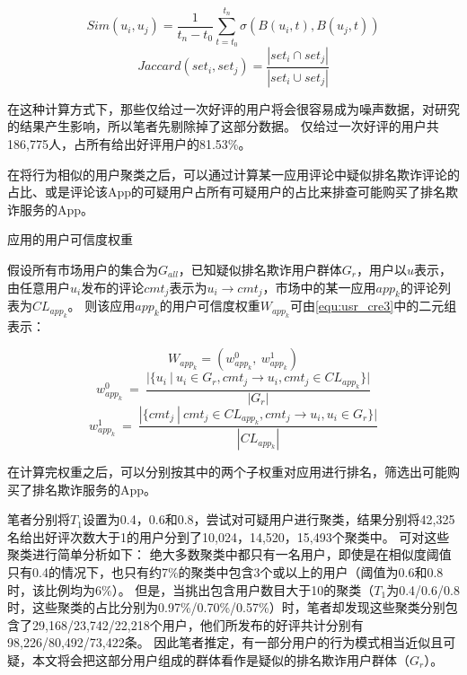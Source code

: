 \begin{equation}
Sim(u_i, u_j) = \frac{1}{t_n - t_0}\sum_{t=t_0}^{t_n}\sigma(B(u_i, t), B(u_j, t))
\label{equ:usr_cre1}
\end{equation}
\begin{equation}
Jaccard(set_i, set_j) = \frac{|set_i \cap set_j|}{|set_i \cup set_j|}
\label{equ:usr_cre2}
\end{equation}
\vspace{0.5mm}

在这种计算方式下，那些仅给过一次好评的用户将会很容易成为噪声数据，对研究的结果产生影响，所以笔者先剔除掉了这部分数据。
仅给过一次好评的用户共186,775人，占所有给出好评用户的81.53\%。

在将行为相似的用户聚类之后，可以通过计算某一应用评论中疑似排名欺诈评论的占比、或是评论该App的可疑用户占所有可疑用户的占比来排查可能购买了排名欺诈服务的App。

\begin{Def}
	应用的用户可信度权重

	假设所有市场用户的集合为$G_{all}$，已知疑似排名欺诈用户群体$G_r$，用户以$u$表示，由任意用户$u_i$发布的评论$cmt_j$表示为$u_i \rightarrow cmt_j$，市场中的某一应用$app_k$的评论列表为$CL_{app_k}$。
	则该应用$app_k$的用户可信度权重$W_{app_k}$可由\autoref{equ:usr_cre3}中的二元组表示：
\end{Def}

\begin{equation}
	W_{app_k} = (w_{app_k}^0, ~w_{app_k}^1)
	\label{equ:usr_cre3}
\end{equation}
\begin{equation}
	w_{app_k}^0 ~ = ~ \frac{|\{u_i~|~u_i \in G_r, cmt_j \rightarrow u_i, cmt_j \in CL_{app_k}\}|}{|G_r|}
	\label{equ:usr_cre4}
\end{equation}
\begin{equation}
	w_{app_k}^1 ~ = ~ \frac{|\{cmt_j~|~cmt_j \in CL_{app_k}, cmt_j \rightarrow u_i, u_i \in G_r\}|}{|CL_{app_k}|}
	\label{equ:usr_cre5}
\end{equation}
\vspace{0.5mm}

在计算完权重之后，可以分别按其中的两个子权重对应用进行排名，筛选出可能购买了排名欺诈服务的App。

笔者分别将$T_1$设置为0.4，0.6和0.8，尝试对可疑用户进行聚类，结果分别将42,325名给出好评次数大于1的用户分到了10,024，14,520，15,493个聚类中。
可对这些聚类进行简单分析如下：
绝大多数聚类中都只有一名用户，即使是在相似度阈值只有0.4的情况下，也只有约7\%的聚类中包含3个或以上的用户（阈值为0.6和0.8时，该比例均为6\%）。
但是，当挑出包含用户数目大于10的聚类（$T_1$为0.4/0.6/0.8时，这些聚类的占比分别为0.97\%/0.70\%/0.57\%）时，笔者却发现这些聚类分别包含了29,168/23,742/22,218个用户，他们所发布的好评共计分别有98,226/80,492/73,422条。
因此笔者推定，有一部分用户的行为模式相当近似且可疑，本文将会把这部分用户组成的群体看作是疑似的排名欺诈用户群体（$G_r$）。

